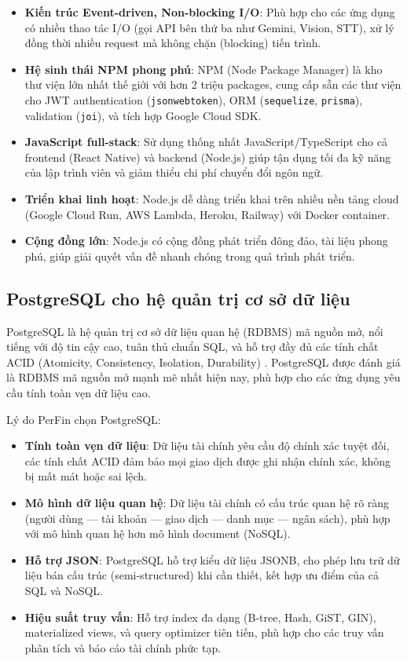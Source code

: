 \begin{itemize}
    \item \textbf{Kiến trúc Event-driven, Non-blocking I/O}: Phù hợp cho các ứng dụng có nhiều thao tác I/O (gọi API bên thứ ba như Gemini, Vision, STT), xử lý đồng thời nhiều request mà không chặn (blocking) tiến trình.
    \item \textbf{Hệ sinh thái NPM phong phú}: NPM (Node Package Manager) là kho thư viện lớn nhất thế giới với hơn 2 triệu packages, cung cấp sẵn các thư viện cho JWT authentication (\texttt{jsonwebtoken}), ORM (\texttt{sequelize}, \texttt{prisma}), validation (\texttt{joi}), và tích hợp Google Cloud SDK.
    \item \textbf{JavaScript full-stack}: Sử dụng thống nhất JavaScript/TypeScript cho cả frontend (React Native) và backend (Node.js) giúp tận dụng tối đa kỹ năng của lập trình viên và giảm thiểu chi phí chuyển đổi ngôn ngữ.
    \item \textbf{Triển khai linh hoạt}: Node.js dễ dàng triển khai trên nhiều nền tảng cloud (Google Cloud Run, AWS Lambda, Heroku, Railway) với Docker container.
    \item \textbf{Cộng đồng lớn}: Node.js có cộng đồng phát triển đông đảo, tài liệu phong phú, giúp giải quyết vấn đề nhanh chóng trong quá trình phát triển.
\end{itemize}

\subsection{PostgreSQL cho hệ quản trị cơ sở dữ liệu}
\label{subsec:postgresql}

PostgreSQL là hệ quản trị cơ sở dữ liệu quan hệ (RDBMS) mã nguồn mở, nổi tiếng với độ tin cậy cao, tuân thủ chuẩn SQL, và hỗ trợ đầy đủ các tính chất ACID (Atomicity, Consistency, Isolation, Durability) \cite{ref17}. PostgreSQL được đánh giá là RDBMS mã nguồn mở mạnh mẽ nhất hiện nay, phù hợp cho các ứng dụng yêu cầu tính toàn vẹn dữ liệu cao.

Lý do PerFin chọn PostgreSQL:

\begin{itemize}
    \item \textbf{Tính toàn vẹn dữ liệu}: Dữ liệu tài chính yêu cầu độ chính xác tuyệt đối, các tính chất ACID đảm bảo mọi giao dịch được ghi nhận chính xác, không bị mất mát hoặc sai lệch.
    \item \textbf{Mô hình dữ liệu quan hệ}: Dữ liệu tài chính có cấu trúc quan hệ rõ ràng (người dùng --- tài khoản --- giao dịch --- danh mục --- ngân sách), phù hợp với mô hình quan hệ hơn mô hình document (NoSQL).
    \item \textbf{Hỗ trợ JSON}: PostgreSQL hỗ trợ kiểu dữ liệu JSONB, cho phép lưu trữ dữ liệu bán cấu trúc (semi-structured) khi cần thiết, kết hợp ưu điểm của cả SQL và NoSQL.
    \item \textbf{Hiệu suất truy vấn}: Hỗ trợ index đa dạng (B-tree, Hash, GiST, GIN), materialized views, và query optimizer tiên tiến, phù hợp cho các truy vấn phân tích và báo cáo tài chính phức tạp.
\end{itemize}

